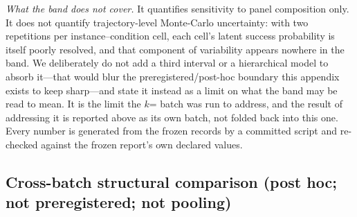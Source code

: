 \documentclass{article}
\begin{document}
\emph{What the band does not cover.} It quantifies sensitivity to panel composition only. It does not quantify trajectory-level Monte-Carlo uncertainty: with two repetitions per instance--condition cell, each cell's latent success probability is itself poorly resolved, and that component of variability appears nowhere in the band. We deliberately do not add a third interval or a hierarchical model to absorb it---that would blur the preregistered/post-hoc boundary this appendix exists to keep sharp---and state it instead as a limit on what the band may be read to mean. It is the limit the $k$=\StatEightAK{} batch was run to address, and the result of addressing it is reported above as its own batch, not folded back into this one. Every number is generated from the frozen records by a committed script and re-checked against the frozen report's own declared values.

\subsection*{Cross-batch structural comparison (post hoc; not preregistered; not pooling)}

\begin{table}[h]
\centering\footnotesize
\caption{Per-instance class and signed difference under each of the two twelve-instance batches. \textbf{This is not pooling and not a backend comparison:} no quantity is summed, averaged or differenced across the two columns, and neither batch licenses an inference about the other's execution conditions. Nor is it a replication under \S\ref{sec:qual}---both batches re-run the \emph{same} frozen instances, which is repeated measurement of stability rather than an enlargement of any projection. Both batches are classified by one function, asserted against the earlier batch's own frozen anatomy block before the comparison is formed.}
\label{tab:concord}

\end{table}
\end{document}
